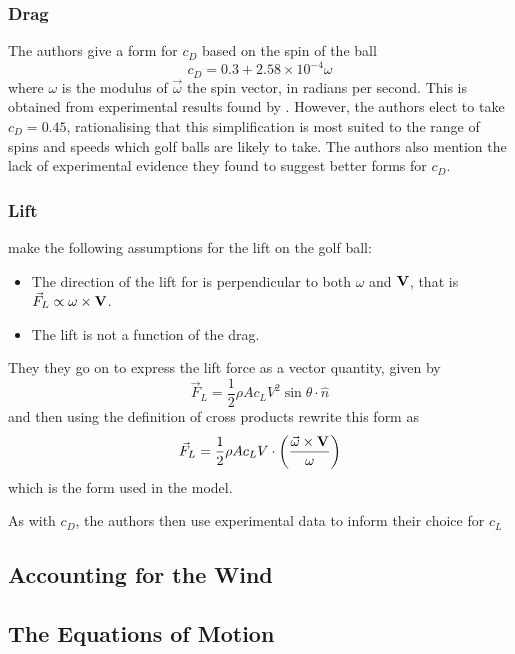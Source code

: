 \subsubsection{Drag}

The authors give a form for $c_D$ based on the spin of the ball
\begin{equation}
c_D = 0.3 + 2.58\times10^{-4}\omega
\end{equation}
where $\omega$ is the modulus of $\vec{\omega}$ the spin vector, in radians per second. This is obtained 
from experimental results found by
\citet{davies1949aerodynamics}. However, the authors elect to take $c_D = 0.45$, rationalising that
this simplification is most suited to the range of spins and speeds which golf balls are likely to
take. The authors also mention the lack of experimental evidence they found to suggest better forms
for $c_D$.

\subsubsection{Lift}

\citeauthor*{Robinson2013} make the following assumptions for the lift on the golf ball:
\begin{itemize}
\item The direction of the lift for is perpendicular to both $\omega$ and $\mathbf{V}$, that is $\vec{F}_{L} \propto \omega \times \mathbf{V}$.
\item The lift is not a function of the drag.
\end{itemize}

They they go on to express the lift force as a vector quantity, given by
\begin{equation}
\vec{F}_{L} = \frac{1}{2} \rho A c_{L} V^2 \sin \theta \cdot \hat{n}
\end{equation}
and then using the definition of cross products rewrite this form as
\begin{equation}
\vec{F}_L = \frac{1}{2} \rho A c_L V \cdot \left(\frac{\vec{\omega} \times \mathbf{V}}{\omega}\right)
\end{equation}
which is the form used in the model.

As with $c_D$, the authors then use experimental data to inform their choice for $c_L$
\subsection{Accounting for the Wind}

\subsection{The Equations of Motion}

